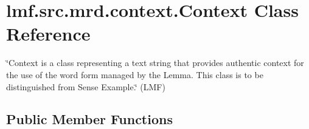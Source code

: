 \hypertarget{classlmf_1_1src_1_1mrd_1_1context_1_1_context}{\section{lmf.\+src.\+mrd.\+context.\+Context Class Reference}
\label{classlmf_1_1src_1_1mrd_1_1context_1_1_context}
}


\char`\"{}\+Context is a class representing a text string that provides authentic context for the use of the word form managed by the Lemma. This class is to be distinguished from Sense Example.\char`\"{} (L\+M\+F)  


\subsection*{Public Member Functions}
